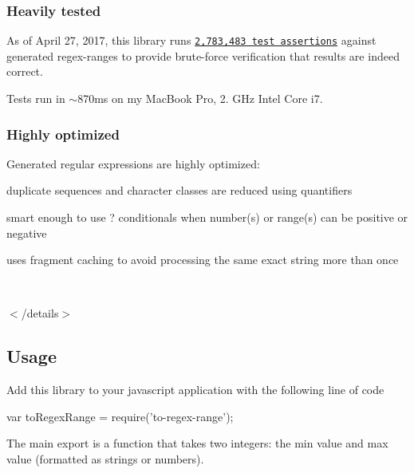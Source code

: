 \subsubsection*{Heavily tested}

As of April 27, 2017, this library runs \href{./test/test.js}{\tt 2,783,483 test assertions} against generated regex-\/ranges to provide brute-\/force verification that results are indeed correct.

Tests run in $\sim$870ms on my Mac\+Book Pro, 2. G\+Hz Intel Core i7.

\subsubsection*{Highly optimized}

Generated regular expressions are highly optimized\+:


\begin{DoxyItemize}
\item duplicate sequences and character classes are reduced using quantifiers
\item smart enough to use {\ttfamily ?} conditionals when number(s) or range(s) can be positive or negative
\item uses fragment caching to avoid processing the same exact string more than once
\end{DoxyItemize}

~\newline


$<$/details$>$

\subsection*{Usage}

Add this library to your javascript application with the following line of code


\begin{DoxyCode}
var toRegexRange = require('to-regex-range');
\end{DoxyCode}


The main export is a function that takes two integers\+: the {\ttfamily min} value and {\ttfamily max} value (formatted as strings or numbers).





